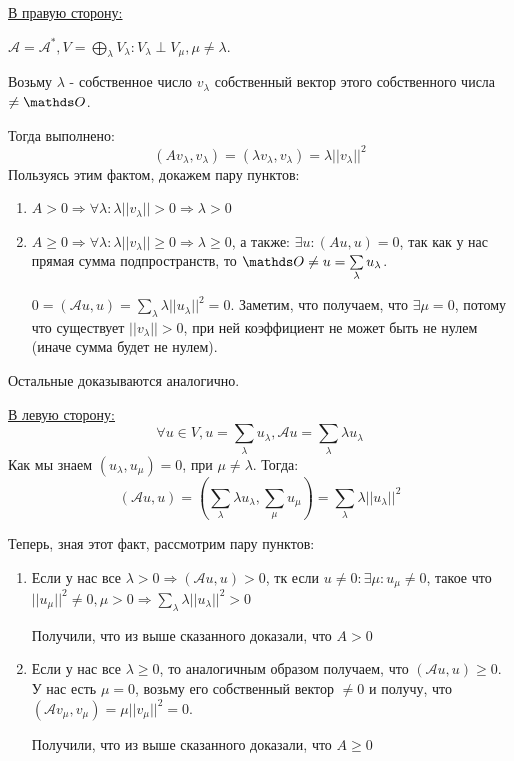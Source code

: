 \uline{В правую сторону:}

$ \mathcal{A} = \mathcal{A}^*, V = \bigoplus\limits_{\lambda} V_\lambda: V_\lambda \perp V_\mu, \mu \neq \lambda$.

Возьму $\lambda$ - собственное число $v_\lambda$ собственный вектор этого собственного числа $\neq \zero$.

Тогда выполнено: $$(Av_\lambda, v_\lambda) = (\lambda v_\lambda, v_\lambda) = \lambda ||v_\lambda||^2$$
Пользуясь этим фактом, докажем пару пунктов:

\begin{enumerate}
    \item $A >0 \Rightarrow \forall \lambda : \lambda ||v_\lambda|| >0 \Rightarrow \lambda >0$
    \item $A \geq  0 \Rightarrow \forall \lambda: \lambda ||v_\lambda|| \geq 0 \Rightarrow \lambda \geq 0$, а также:
    $\exists u: (Au,u) = 0$, так как у нас прямая сумма подпространств, то $\zero \neq u = \sum\limits_\lambda u_\lambda$.

    $0=(\mathcal{A}u,u) = \sum\limits_\lambda \lambda||u_\lambda||^2 =0$. Заметим, что получаем, что $\exists \mu = 0$, потому что существует $||v_\lambda|| > 0 $, при ней коэффициент не может быть не нулем (иначе сумма будет не нулем).
\end{enumerate}
Остальные доказываются аналогично.

\uline{В левую сторону:}
$$\forall u \in V, u =\sum\limits_{\lambda}  u_\lambda, \mathcal{A}u = \sum\limits_{\lambda} \lambda u_\lambda$$
Как мы знаем $(u_\lambda, u_\mu ) = 0$, при $ \mu \neq \lambda$. Тогда: $$(\mathcal{A}u,u) = (\sum\limits_{\lambda}\lambda u_\lambda, \sum\limits_\mu u_\mu)  = \sum\limits_{\lambda}\lambda ||u_\lambda||^2 $$

Теперь, зная этот факт, рассмотрим пару пунктов:

\begin{enumerate}
    \item Если у нас все $\lambda > 0 \Rightarrow (\mathcal{A}u,u) > 0$, тк если $u \neq 0 : \exists \mu: u_\mu \neq 0$, такое что $||u_\mu||^2 \neq 0, \mu >0 \Rightarrow \sum\limits_{\lambda}\lambda||u_\lambda||^2 > 0$

    Получили, что из выше сказанного доказали, что $A > 0$

    \item Если у нас все $\lambda \geq 0$, то аналогичным образом получаем, что $ (\mathcal{A}u,u) \geq 0$. У нас есть $\mu = 0$, возьму его собственный вектор $\neq 0$ и получу, что $(\mathcal{A} v_\mu,v_\mu) = \mu ||v_\mu||^2 = 0$.

     Получили, что из выше сказанного доказали, что $A \geq 0$
\end{enumerate}

